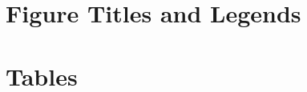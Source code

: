 \documentclass[12pt]{article}
\begin{document}







\newpage
\section*{Figure Titles and Legends}









\section*{Tables}




\end{document}
